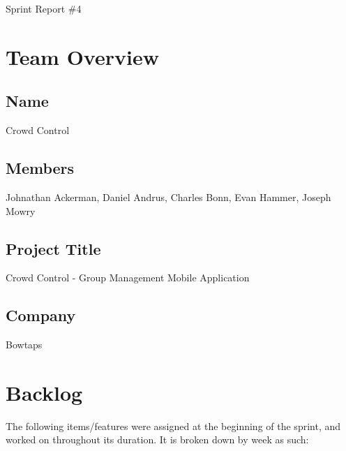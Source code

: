 \documentclass[11pt]{article}
\begin{document}
{\fontsize{16}{16}\selectfont Sprint Report \#4}

\section*{Team Overview}

\subsection*{Name}
Crowd Control
\subsection*{Members}
Johnathan Ackerman, Daniel Andrus, Charles Bonn, Evan Hammer, Joseph Mowry
\subsection*{Project Title}
Crowd Control - Group Management Mobile Application
\subsection*{Company}
Bowtaps


\section*{Backlog}
The following items/features were assigned at the beginning of the sprint, and worked on throughout its duration. It is broken down by week as such:
\end{document}
